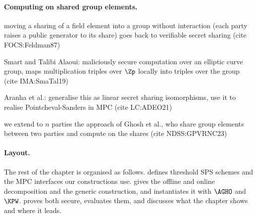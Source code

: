\paragraph{Computing on shared group elements.}
\begin{outline}
  \item moving a sharing of a field element into a group without interaction
(each party raises a public generator to its share) goes back to verifiable
secret sharing (cite FOCS:Feldman87)
  \item Smart and Talibi Alaoui: maliciously secure computation over an elliptic
curve group, maps multiplication triples over $\Zp$ locally into triples over the
group (cite IMA:SmaTal19)
  \item Aranha et al.: generalise this as linear secret sharing isomorphisms, use
it to realise Pointcheval-Sanders in MPC (cite LC:ADEO21)
  \item we extend to $n$ parties the approach of Ghosh et al., who share group
elements between two parties and compute on the shares (cite NDSS:GPVRNC23)
\end{outline}

\paragraph{Layout.} The rest of the chapter is organised as follows.  defines threshold SPS schemes
and the MPC interfaces our constructions use.
 gives the offline and online decomposition and the
generic construction, and  instantiates it with
$\AGHO$ and $\KPW$.  proves both secure,
 evaluates them, and 
discusses what the chapter shows and where it leads.
